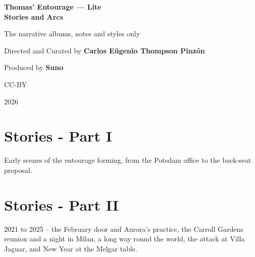 \documentclass[a4paper]{memoir}
\begin{document}
\frontmatter
\begin{titlingpage}
\centering
\vspace*{\fill}
{\LARGE\bfseries Thomas' Entourage --- Lite\\\Huge Stories and Arcs\par}
\bigskip
{\large The narrative albums, notes and styles only\par}
\vspace*{\fill}
{\normalsize Directed and Curated by \bfseries Carlos Eŭgenĭo Thompson Pinzón\par}
{\normalsize Produced by \bfseries Suno\par}
\bigskip
{\normalsize CC-BY\par}
{\normalsize 2026\par}
\vspace*{\fill}
\end{titlingpage}

\tableofcontents*

\mainmatter
\renewcommand\chaptername{Album~}
\chapter{Stories - Part I}
Early scenes of the entourage forming, from the Potsdam office to the back-seat proposal.


\chapter{Stories - Part II}
2021 to 2025 -- the February door and Aurora's practice, the Carroll Gardens reunion and a night in Milan, a long way round the world, the attack at Villa Jaguar, and New Year at the Melgar table.

\end{document}
